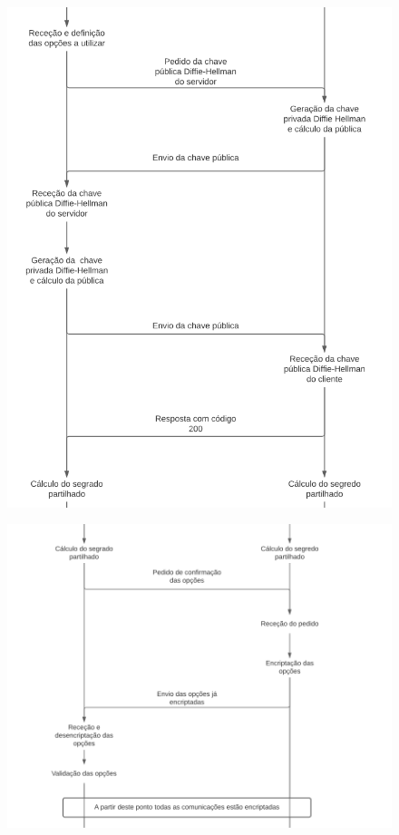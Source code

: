 \documentclass[10pt,english]{article}
\begin{document}
\begin{figure}[!h]
        \centering
        \includegraphics[width=\textwidth]{images/2.png}
\end{figure}

\begin{figure}[!h]
        \centering
        \includegraphics[width=\textwidth]{images/3.png}
\end{figure}
\end{document}
